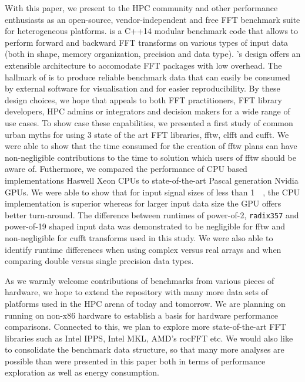 
With this paper, we present \gearshifft{} to the HPC community and other performance enthusiasts as an open-source, vendor-independent and free FFT benchmark suite for heterogeneous platforms. \gearshifft{} is a C++14 modular benchmark code that allows to perform forward and backward FFT transforms on various types of input data (both in shape, memory organization, precision and data type). \gearshifft{}'s design offers an extensible architecture to accomodate FFT packages with low overhead. The hallmark of \gearshifft{} is to produce reliable benchmark data that can easily be consumed by external software for visualisation and for easier reproducibility. By these design choices, we hope that \gearshifft{} appeals to both FFT practitioners, FFT library developers, HPC admins or integrators and decision makers for a wide range of use cases. To show case these capabilities, we presented a first study of common urban myths for using 3 state of the art FFT libraries, fftw, clfft and cufft. We were able to show that the time consumed for the creation of fftw plans can have non-negligible contributions to the time to solution which users of fftw should be aware of. Futhermore, we compared the performance of CPU based implementations Haswell Xeon CPUs to state-of-the-art Pascal generation Nvidia GPUs. We were able to show that for input signal sizes of less than \SI{1}{\mebi\byte}, the CPU implementation is superior whereas for larger input data size the GPU offers better turn-around. The difference between runtimes of power-of-2, {\tt radix357} and power-of-19 shaped input data was demonstrated to be negligible for fftw and non-negligible for cufft transforms used in this study. We were also able to identify runtime differences when using complex versus real arrays and when comparing double versus single precision data types.     

As we warmly welcome contributions of benchmarks from various pieces of hardware, we hope to extend the \gearshifft{} repository with many more data sets of platforms used in the HPC arena of today and tomorrow. We are planning on running \gearshifft{} on non-x86 hardware to establish a basis for hardware performance comparisons. Connected to this, we plan to explore more state-of-the-art FFT libraries such as Intel IPPS, Intel MKL, AMD's rocFFT etc. We would also like to consolidate the benchmark data structure, so that many more analyses are possible than were presented in this paper both in terms of performance exploration as well as energy consumption.  

